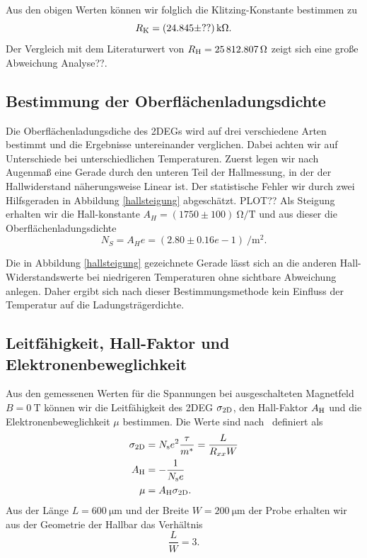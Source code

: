 \documentclass[paper=a4,fontsize=10pt,DIV=18,twocolumn,parskip=half]{scrartcl}
\numberwithin{equation}{section}    %
\newcommand{\note}[1]{{\color{red}#1??}}
\begin{document}
Aus den obigen Werten können wir folglich die Klitzing-Konstante bestimmen zu
\begin{equation}
	R_{\rm K} = (24.845 \pm ??)\,\SI{}{\kilo\ohm}.
\end{equation}
Der Vergleich mit dem Literaturwert von $R_{\rm H} = \SI{25812.807}{\ohm}$ zeigt sich eine große Abweichung \note{Analyse}.

\subsection{Bestimmung der Oberflächenladungsdichte}
Die Oberflächenladungsdiche des 2DEGs wird auf drei verschiedene Arten bestimmt und die Ergebnisse untereinander verglichen. Dabei achten wir auf Unterschiede bei unterschiedlichen Temperaturen. Zuerst legen wir nach Augenmaß eine Gerade durch den unteren Teil der Hallmessung, in der der Hallwiderstand näherungsweise Linear ist. Der statistische Fehler wir durch zwei Hilfsgeraden in Abbildung \ref{hallsteigung} abgeschätzt. 
PLOT??
Als Steigung erhalten wir die Hall-konstante $A_H=(1750 \pm 100)\SI{}{\ohm\per\tesla}$ und aus dieser die Oberflächenladungsdichte
\begin{equation}
N_S=A_H e = (2.80 \pm 0.16e-1)\SI{}{\per\square\meter}.
\label{ns1}
\end{equation}

Die in Abbildung \ref{hallsteigung} gezeichnete Gerade lässt sich an die anderen Hall-Widerstandswerte bei niedrigeren Temperaturen ohne sichtbare Abweichung anlegen. Daher ergibt sich nach dieser Bestimmungsmethode kein Einfluss der Temperatur auf die Ladungsträgerdichte.


\subsection{Leitfähigkeit, Hall-Faktor und Elektronenbeweglichkeit}
\label{a3}

Aus den gemessenen Werten für die Spannungen bei ausgeschalteten Magnetfeld $B=\SI{0}{\tesla}$ können wir die Leitfähigkeit des 2DEG $\sigma_{\rm 2D}$, den Hall-Faktor $A_{\rm H}$ und die Elektronenbeweglichkeit $\mu$ bestimmen. Die Werte sind nach~\citet{anleitung} definiert als
\begin{align}
	\sigma_{\rm 2D} &= N_{\rm s} e^2 \frac{\tau}{m^*} = \frac{L}{R_{xx} W}\\
	A_{\rm H} 		&= -\frac{1}{N_{\rm s}e}\\
	\mu 			&= A_{\rm H} \sigma_{\rm 2D}.
	\label{eq.leithallbeweg}
\end{align}
Aus der Länge $L=\SI{600}{\micro\meter}$ und der Breite $W=\SI{200}{\micro\meter}$ der Probe erhalten wir aus der Geometrie der Hallbar das Verhältnis
\begin{equation}
	\frac{L}{W} = 3.
\end{equation}
\end{document}
